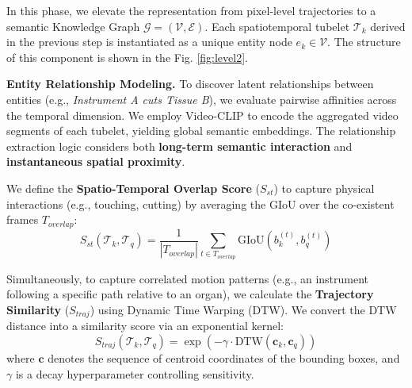
In this phase, we elevate the representation from pixel-level trajectories to a semantic Knowledge Graph $\mathcal{G} = (\mathcal{V}, \mathcal{E})$. Each spatiotemporal tubelet $\mathcal{T}_k$ derived in the previous step is instantiated as a unique entity node $e_k \in \mathcal{V}$. The structure of this component is shown in the Fig. \ref{fig:level2}.

\textbf{Entity Relationship Modeling.}
To discover latent relationships between entities (e.g., \textit{Instrument A cuts Tissue B}), we evaluate pairwise affinities across the temporal dimension. We employ Video-CLIP \cite{videoclip}to encode the aggregated video segments of each tubelet, yielding global semantic embeddings. The relationship extraction logic considers both \textbf{long-term semantic interaction} and \textbf{instantaneous spatial proximity}.

We define the \textbf{Spatio-Temporal Overlap Score} ($S_{st}$) to capture physical interactions (e.g., touching, cutting) by averaging the GIoU over the co-existent frames $T_{overlap}$:
\begin{equation}
    S_{st}(\mathcal{T}_k, \mathcal{T}_q) = \frac{1}{|T_{overlap}|} \sum_{t \in T_{overlap}} \text{GIoU}(b_k^{(t)}, b_q^{(t)})
\end{equation}

Simultaneously, to capture correlated motion patterns (e.g., an instrument following a specific path relative to an organ), we calculate the \textbf{Trajectory Similarity} ($S_{traj}$) using Dynamic Time Warping (DTW). We convert the DTW distance into a similarity score via an exponential kernel:
\begin{equation}
    S_{traj}(\mathcal{T}_k, \mathcal{T}_q) = \exp\left(-\gamma \cdot \text{DTW}(\mathbf{c}_k, \mathbf{c}_q)\right)
\end{equation}
where $\mathbf{c}$ denotes the sequence of centroid coordinates of the bounding boxes, and $\gamma$ is a decay hyperparameter controlling sensitivity.

